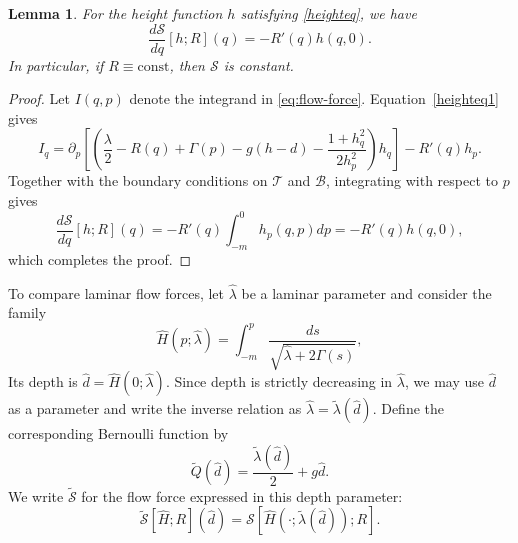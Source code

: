 \documentclass[12pt,letterpaper]{amsart}
\newtheorem{lemma}[theorem]{Lemma}
\numberwithin{equation}{section}
\begin{document}
	\begin{lemma}
	For the height function $h$ satisfying \eqref{heighteq}, we have
	\begin{equation}\label{eq:flow-force-balance}
		\frac{d\mathscr S}{dq}[h;R](q)=-R'(q)h(q,0).
	\end{equation}
	In particular, if $R\equiv\mathrm{const}$, then $\mathscr S$ is constant.
\end{lemma}
\begin{proof}
	{Let $I(q,p)$ denote the integrand in \eqref{eq:flow-force}. Equation~\eqref{heighteq1} gives}
	\begin{equation*}
		I_q=\partial_p\left[
		\left(\frac{\lambda}{2}-R(q)+\Gamma(p)-g(h-d)
		-\frac{1+h_q^2}{2h_p^2}\right)h_q
		\right]-R'(q)h_p.
	\end{equation*}
	Together with the boundary conditions on $\mathcal T$ and $\mathcal B$, integrating with respect to $p$ gives
	\begin{equation*}
		\frac{d\mathscr S}{dq}[h;R](q)
		=-R'(q)\int_{-m}^0h_p(q,p)dp
		=-R'(q)h(q,0),
	\end{equation*}
	which completes the proof.
\end{proof}

	{To compare laminar flow forces, let $\hat\lambda$ be a laminar parameter and consider the family}
	\begin{equation*}
		\hat H(p;\hat\lambda)=\int_{-m}^p\frac{ds}{\sqrt{\hat\lambda+2\Gamma(s)}},
	\end{equation*}
	{Its depth is $\hat d=\hat H(0;\hat\lambda)$. Since depth is strictly decreasing in $\hat\lambda$, we may use $\hat d$ as a parameter and write the inverse relation as $\hat\lambda=\tilde\lambda(\hat d)$. Define the corresponding Bernoulli function by}
	\begin{equation*}
		\tilde Q(\hat d)=\frac{\tilde\lambda(\hat d)}{2}+g\hat d.
	\end{equation*}
	{We write $\tilde{\mathscr S}$ for the flow force expressed in this depth parameter:}
	\begin{equation*}
		\tilde{\mathscr S}[\hat H;R](\hat d)
		=\mathscr S[\hat H(\cdot;\tilde\lambda(\hat d));R].
	\end{equation*}
\end{document}
